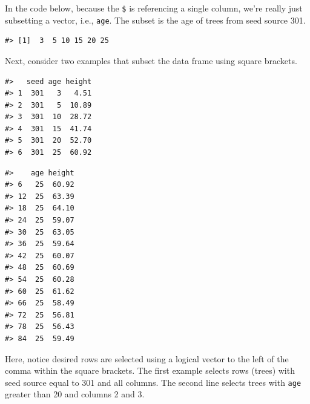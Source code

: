\documentclass[
  11pt,
]{krantz}
\newenvironment{Shaded}{\begin{snugshade}}{\end{snugshade}}
\newcommand{\DecValTok}[1]{\textcolor[rgb]{0.00,0.00,0.81}{#1}}
\newcommand{\NormalTok}[1]{#1}
\newcommand{\OperatorTok}[1]{\textcolor[rgb]{0.81,0.36,0.00}{\textbf{#1}}}
\newcommand{\StringTok}[1]{\textcolor[rgb]{0.31,0.60,0.02}{#1}}
\theoremstyle{definition}
\theoremstyle{definition}
\theoremstyle{definition}
\theoremstyle{definition}
\theoremstyle{remark}
\begin{document}
In the code below, because the \texttt{\$} is referencing a single column, we're really just subsetting a vector, i.e., \texttt{age}. The subset is the age of trees from seed source 301.

\begin{Shaded}
\end{Shaded}

\begin{verbatim}
#> [1]  3  5 10 15 20 25
\end{verbatim}

Next, consider two examples that subset the data frame using square brackets.

\begin{Shaded}
\end{Shaded}

\begin{verbatim}
#>   seed age height
#> 1  301   3   4.51
#> 2  301   5  10.89
#> 3  301  10  28.72
#> 4  301  15  41.74
#> 5  301  20  52.70
#> 6  301  25  60.92
\end{verbatim}

\begin{Shaded}
\end{Shaded}

\begin{verbatim}
#>    age height
#> 6   25  60.92
#> 12  25  63.39
#> 18  25  64.10
#> 24  25  59.07
#> 30  25  63.05
#> 36  25  59.64
#> 42  25  60.07
#> 48  25  60.69
#> 54  25  60.28
#> 60  25  61.62
#> 66  25  58.49
#> 72  25  56.81
#> 78  25  56.43
#> 84  25  59.49
\end{verbatim}

Here, notice desired rows are selected using a logical vector to the left of the comma within the square brackets. The first example selects rows (trees) with seed source equal to 301 and all columns. The second line selects trees with \texttt{age} greater than 20 and columns 2 and 3.
\end{document}
